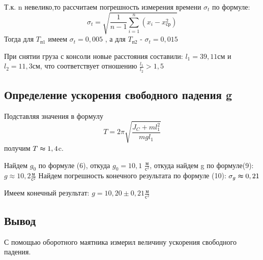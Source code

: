 \documentclass[a4paper]{article}
\begin{document}
Т.к. n невелико,то рассчитаем погрешность измерения времени $\sigma_{t}$ по формуле:
\[\sigma_{t} = \sqrt{\frac{1}{n-1}\sum_{i = 1}^{n}(x_{i}-x_{\text{ср}}^2)   }\]
Тогда для $T_{\text{п1}}$ имеем $\sigma_{t} = 0,005$ , а для  $T_{\text{п2}}$ - $\sigma_{t} = 0,015$\par
При снятии груза с консоли новые расстояния составили: $l_{1} = 39,11$см и $l_{2} = 11,3$см, что соответствует отношению $\frac{l_{1}}{l_{2}} >1,5$


\subsection{Определение ускорения свободного падения g }
Подставляя значения в формулу
\[T = 2\pi \sqrt{\frac{J_{C}+ ml_{1}^2}{mgl_{1}} } \]
получим $T \thickapprox 1,4$c. \par
Найдем $g_{0}$ по формуле (6), откуда $g_{0} = 10,1 $ $\frac{\text{м}}{\text{с}^2} $, откуда найдем g по формуле(9): $g\approx 10,2$$\frac{\text{м}}{\text{с}^2} $  
Найдем погрешность конечного результата по формуле (10): $\sigma_{g} \thickapprox 0,21$\par
Имеем конечный результат: $g = 10,20\pm 0,21$$\frac{\text{м}}{\text{с}^2} $

\subsection{Вывод}
С помощью оборотного маятника измерил величину ускорения свободного падения.
\end{document}
